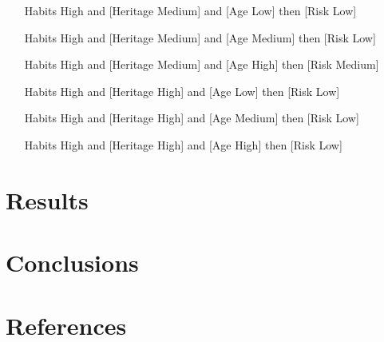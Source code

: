 \documentclass[conference]{IEEEtran}
\begin{document}
\begin{enumerate}
\item [Habits High] and [Heritage Medium] and [Age Low] then [Risk Low]
\item [Habits High] and [Heritage Medium] and [Age Medium] then [Risk Low]
\item [Habits High] and [Heritage Medium] and [Age High] then [Risk Medium]
\item [Habits High] and [Heritage High] and [Age Low] then [Risk Low]
\item [Habits High] and [Heritage High] and [Age Medium] then [Risk Low]
\item [Habits High] and [Heritage High] and [Age High] then [Risk Low]
\end{enumerate}

\section{Results}

\section{Conclusions}

\section*{References}

\nocite{*}


\end{document}
